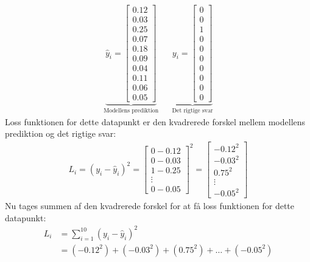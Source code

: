 \documentclass{article}
\begin{document}
\begin{align}
  \underbrace{\hat{y}_i = \begin{bmatrix}
    0.12 \\
    0.03 \\
    0.25 \\
    0.07 \\
    0.18 \\
    0.09 \\
    0.04 \\
    0.11 \\
    0.06 \\
    0.05
  \end{bmatrix}}_{\text{Modellens prediktion}}
  &&
  \underbrace{y_i = \begin{bmatrix}
    0 \\
    0 \\
    1 \\
    0 \\
    0 \\
    0 \\
    0 \\
    0 \\
    0 \\
    0
  \end{bmatrix}}_{\text{Det rigtige svar}}
\end{align}
Loss funktionen for dette datapunkt er den kvadrerede forskel mellem modellens prediktion og det rigtige svar:
\begin{align}
  L_i = (y_i - \hat{y}_i)^2 = \begin{bmatrix}
    0 - 0.12 \\
    0 - 0.03 \\
    1 - 0.25 \\
    \vdots \\
    0 - 0.05
  \end{bmatrix}^2 = \begin{bmatrix}
    -0.12^2 \\
    -0.03^2 \\
    0.75^2 \\
    \vdots \\
    -0.05^2
  \end{bmatrix}
\end{align}
Nu tages summen af den kvadrerede forskel for at få loss funktionen for dette datapunkt:
\begin{align}
  L_i &= \sum_{i=1}^{10} (y_i - \hat{y}_i)^2\\
      &= (-0.12^2) + (-0.03^2) + (0.75^2) + \ldots + (-0.05^2)
\end{align}
\end{document}

